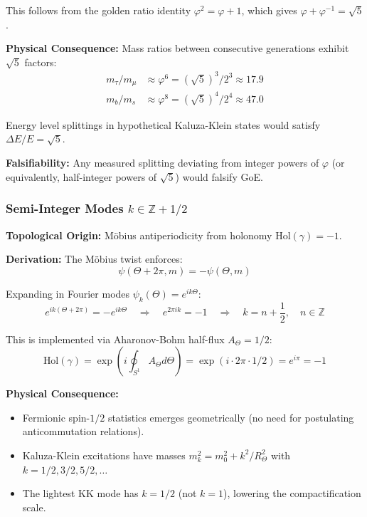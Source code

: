 \documentclass[12pt]{article}
\begin{document}
This follows from the golden ratio identity $\varphi^2 = \varphi + 1$, which gives $\varphi + \varphi^{-1} = \sqrt{5}$.

\textbf{Physical Consequence:} Mass ratios between consecutive generations exhibit $\sqrt{5}$ factors:
\begin{align}
m_\tau / m_\mu &\approx \varphi^6 = (\sqrt{5})^3 / 2^3 \approx 17.9 \\
m_b / m_s &\approx \varphi^8 = (\sqrt{5})^4 / 2^4 \approx 47.0
\end{align}

Energy level splittings in hypothetical Kaluza-Klein states would satisfy $\Delta E / E = \sqrt{5}$.

\textbf{Falsifiability:} Any measured splitting deviating from integer powers of $\varphi$ (or equivalently, half-integer powers of $\sqrt{5}$) would falsify GoE.

\subsubsection{Semi-Integer Modes $k \in \mathbb{Z} + 1/2$}

\textbf{Topological Origin:} M\"obius antiperiodicity from holonomy $\text{Hol}(\gamma) = -1$.

\textbf{Derivation:} The M\"obius twist enforces:
\begin{equation}
\psi(\Theta + 2\pi, m) = -\psi(\Theta, m)
\end{equation}

Expanding in Fourier modes $\psi_k(\Theta) = e^{ik\Theta}$:
\begin{equation}
e^{ik(\Theta + 2\pi)} = -e^{ik\Theta} \quad \Rightarrow \quad e^{2\pi i k} = -1 \quad \Rightarrow \quad k = n + \frac{1}{2}, \quad n \in \mathbb{Z}
\end{equation}

This is implemented via Aharonov-Bohm half-flux $A_\Theta = 1/2$:
\begin{equation}
\text{Hol}(\gamma) = \exp\left(i \oint_{S^1} A_\Theta d\Theta\right) = \exp(i \cdot 2\pi \cdot 1/2) = e^{i\pi} = -1
\end{equation}

\textbf{Physical Consequence:} 
\begin{itemize}
\item Fermionic spin-$1/2$ statistics emerges geometrically (no need for postulating anticommutation relations).
\item Kaluza-Klein excitations have masses $m_k^2 = m_0^2 + k^2/R_\Theta^2$ with $k = 1/2, 3/2, 5/2, \ldots$
\item The lightest KK mode has $k = 1/2$ (not $k=1$), lowering the compactification scale.
\end{itemize}
\end{document}
